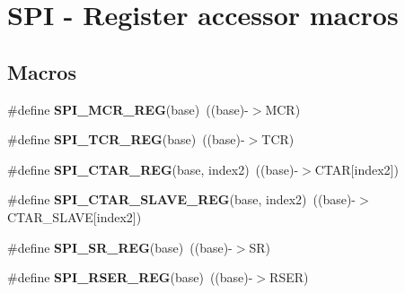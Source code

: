 \hypertarget{group__SPI__Register__Accessor__Macros}{}\section{S\+PI -\/ Register accessor macros}
\label{group__SPI__Register__Accessor__Macros}
\subsection*{Macros}
\begin{DoxyCompactItemize}
\item 
\#define {\bfseries S\+P\+I\+\_\+\+M\+C\+R\+\_\+\+R\+EG}(base)~((base)-\/$>$M\+CR)\hypertarget{group__SPI__Register__Accessor__Macros_ga02f3e3aa90fc1cdfb071320ce19987ac}{}\label{group__SPI__Register__Accessor__Macros_ga02f3e3aa90fc1cdfb071320ce19987ac}

\item 
\#define {\bfseries S\+P\+I\+\_\+\+T\+C\+R\+\_\+\+R\+EG}(base)~((base)-\/$>$T\+CR)\hypertarget{group__SPI__Register__Accessor__Macros_ga59171d40915f579f0444e2036c67d9f5}{}\label{group__SPI__Register__Accessor__Macros_ga59171d40915f579f0444e2036c67d9f5}

\item 
\#define {\bfseries S\+P\+I\+\_\+\+C\+T\+A\+R\+\_\+\+R\+EG}(base,  index2)~((base)-\/$>$C\+T\+AR\mbox{[}index2\mbox{]})\hypertarget{group__SPI__Register__Accessor__Macros_gacbd9cd0fec440c317a022bcf3648af57}{}\label{group__SPI__Register__Accessor__Macros_gacbd9cd0fec440c317a022bcf3648af57}

\item 
\#define {\bfseries S\+P\+I\+\_\+\+C\+T\+A\+R\+\_\+\+S\+L\+A\+V\+E\+\_\+\+R\+EG}(base,  index2)~((base)-\/$>$C\+T\+A\+R\+\_\+\+S\+L\+A\+VE\mbox{[}index2\mbox{]})\hypertarget{group__SPI__Register__Accessor__Macros_ga8cc645b8d22dd9721ab6fa01357b2d8f}{}\label{group__SPI__Register__Accessor__Macros_ga8cc645b8d22dd9721ab6fa01357b2d8f}

\item 
\#define {\bfseries S\+P\+I\+\_\+\+S\+R\+\_\+\+R\+EG}(base)~((base)-\/$>$SR)\hypertarget{group__SPI__Register__Accessor__Macros_ga0e3d3fae279a7f98aec5aebeb1c6b0bb}{}\label{group__SPI__Register__Accessor__Macros_ga0e3d3fae279a7f98aec5aebeb1c6b0bb}

\item 
\#define {\bfseries S\+P\+I\+\_\+\+R\+S\+E\+R\+\_\+\+R\+EG}(base)~((base)-\/$>$R\+S\+ER)\hypertarget{group__SPI__Register__Accessor__Macros_ga8f533d7434b45c8f009c8167748de39d}{}\label{group__SPI__Register__Accessor__Macros_ga8f533d7434b45c8f009c8167748de39d}


\end{DoxyCompactItemize}
